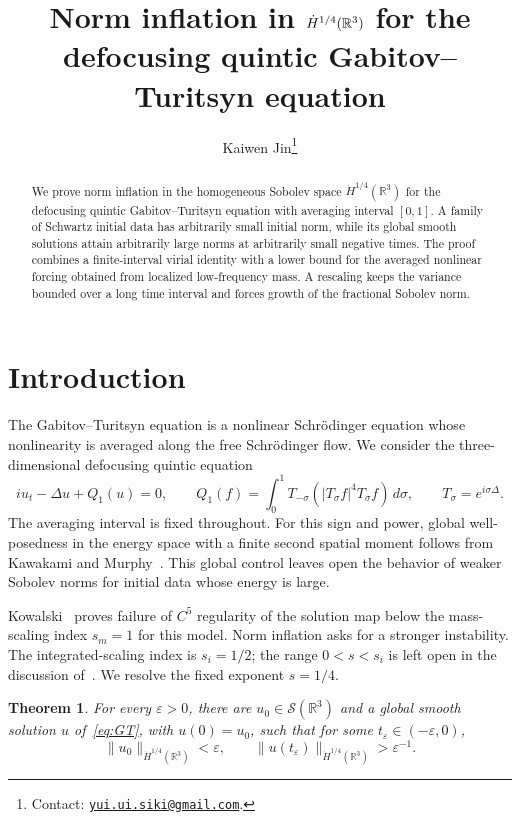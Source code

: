 \documentclass[11pt]{article}
\title{Norm inflation in $\dot H^{1/4}(\R^3)$ for the defocusing quintic Gabitov--Turitsyn equation}
\author{Kaiwen Jin\thanks{Contact: \href{mailto:yui.ui.siki@gmail.com}{\texttt{yui.ui.siki@gmail.com}}.}}
\date{}
\newcommand{\R}{\mathbb R}
\numberwithin{equation}{section}
\newtheorem{theorem}{Theorem}[section]
\begin{document}
\maketitle
\begin{abstract}
We prove norm inflation in the homogeneous Sobolev space $\dot H^{1/4}(\R^3)$
for the defocusing quintic Gabitov--Turitsyn equation with averaging interval
$[0,1]$. A family of Schwartz initial data has arbitrarily small initial norm,
while its global smooth solutions attain arbitrarily large norms at arbitrarily
small negative times. The proof combines a finite-interval virial identity with
a lower bound for the averaged nonlinear forcing obtained from localized
low-frequency mass. A rescaling keeps the variance bounded over a long time
interval and forces growth of the fractional Sobolev norm.
\end{abstract}

\section{Introduction}\label{sec:intro}

The Gabitov--Turitsyn equation is a nonlinear Schr\"odinger equation whose
nonlinearity is averaged along the free Schr\"odinger flow. We consider the
three-dimensional defocusing quintic equation
\begin{equation}\label{eq:GT}
 iu_t-\Delta u+Q_1(u)=0,\qquad
 Q_1(f)=\int_0^1T_{-\sigma}(|T_\sigma f|^4T_\sigma f)\,d\sigma,
 \qquad T_\sigma=e^{i\sigma\Delta}.
\end{equation}
The averaging interval is fixed throughout. For this sign and power, global
well-posedness in the energy space with a finite second spatial moment follows
from Kawakami and Murphy~\cite[Proposition~5.1]{KM}. This global control leaves
open the behavior of weaker Sobolev norms for initial data whose energy is large.

Kowalski~\cite[Theorem~1.2]{K} proves failure of $C^5$ regularity of the solution
map below the mass-scaling index $s_m=1$ for this model. Norm inflation asks
for a stronger instability. The integrated-scaling index is $s_i=1/2$;
the range $0<s<s_i$ is left open in the discussion
of~\cite[Section~6.4]{K}. We resolve the fixed exponent $s=1/4$.

\begin{theorem}\label{thm:inflation}
For every $\varepsilon>0$, there are $u_0\in\mathcal S(\R^3)$ and a global
smooth solution $u$ of~\eqref{eq:GT}, with $u(0)=u_0$, such that for some
$t_\varepsilon\in(-\varepsilon,0)$,
\[
 \|u_0\|_{\dot H^{1/4}(\R^3)}<\varepsilon,
 \qquad \|u(t_\varepsilon)\|_{\dot H^{1/4}(\R^3)}>\varepsilon^{-1}.
\]
\end{theorem}
\end{document}
